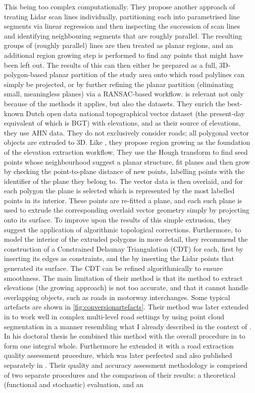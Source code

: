 This being too complex computationally. They propose another approach of treating Lidar scan lines individually, partitioning each into parametrised line segments via linear regression and then inspecting the succession of scan lines and identifying neighbouring segments that are roughly parallel. The resulting groups of (roughly parallel) lines are then treated as planar regions, and an additional region growing step is performed to find any points that might have been left out. The results of this can then either be prepared as a full, 3D-polygon-based planar partition of the study area onto which road polylines can simply be projected, or by further refining the planar partition (eliminating small, meaningless planes) via a RANSAC-based workflow. \cite{oudeElberink_vosselman_2006} is relevant not only because of the methods it applies, but also the datasets. They enrich the best-known Dutch open data national topographical vector dataset (the present-day equivalent of which is BGT) with elevations, and as their source of elevations, they use AHN data. They do not exclusively consider roads; all polygonal vector objects are extruded to 3D. Like \cite{hatger_brenner_2003}, they propose region growing as the foundation of the elevation extraction workflow. They use the Hough transform to find seed points whose neighbourhood suggest a planar structure, fit planes and then grow by checking the point-to-plane distance of new points, labelling points with the identifier of the plane they belong to. The vector data is then overlaid, and for each polygon the plane is selected which is represented by the most labelled points in its interior. These points are re-fitted a plane, and each such plane is used to extrude the corresponding overlaid vector geometry simply by projecting onto its surface. To improve upon the results of this simple extrusion, they suggest the application of algorithmic topological corrections. Furthermore, to model the interior of the extruded polygons in more detail, they recommend the construction of a Constrained Delaunay Triangulation (CDT) for each, first by inserting its edges as constraints, and the by inserting the Lidar points that generated its surface. The CDT can be refined algorithmically to ensure smoothness. The main limitation of their method is that its method to extract elevations (the growing approach) is not too accurate, and that it cannot handle overlapping objects, such as roads in motorway interchanges. Some typical artefacts are shown in \ref{fig:conversionartefacts}. Their method was later extended in \cite{oudeElberink_vosselman_2009} to work well in complex multi-level road settings by using point cloud segmentation in a manner resembling what I already described in the context of \cite{boyko_funkhauser_2011}. In his doctoral thesis \cite{oudeElberink_2010} he combined this method with the overall procedure in \cite{oudeElberink_vosselman_2006} to form one integral whole. Furthermore he extended it with a road extraction quality assessment procedure, which was later perfected and also published separately in \cite{oudeElberink_vosselman_2012}. Their quality and accuracy assessment methodology is comprised of two separate procedures and the comparison of their results: a theoretical (functional and stochastic) evaluation, and an 
